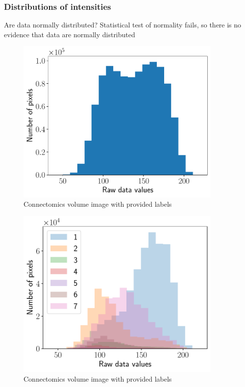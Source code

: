 \documentclass{beamer}
\begin{document}
\begin{frame}
    \frametitle{Distributions of intensities}
    \begin{alertblock}{Are data normally distributed?}
        Statistical test of normality fails, so there is no evidence that data are normally distributed
    \end{alertblock}
    \begin{minipage}{0.49\textwidth}
        \centering
        \begin{figure}
            \includegraphics[width=0.9\textwidth]{raw_data_dist.pdf}
            \caption{Connectomics volume image with provided labels}
        \end{figure}
    \end{minipage}
    \begin{minipage}{0.49\textwidth}
        \centering
        \begin{figure}
            \includegraphics[width=0.9\textwidth]{raw_data_dist_per_label.pdf}
            \caption{Connectomics volume image with provided labels}
        \end{figure}
    \end{minipage}
\end{frame}
\end{document}
